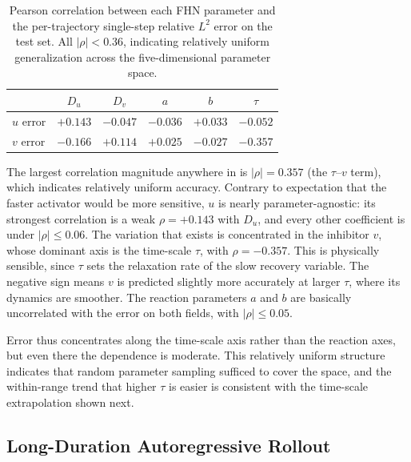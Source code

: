 \documentclass[runningheads]{llncs}
\begin{document}
\begin{table}[!ht]
\begin{center}
\begin{small}
\begin{sc}
\begin{tabular}{lccccc}
\toprule
 & $D_u$ & $D_v$ & $a$ & $b$ & $\tau$ \\
\midrule
$u$ error & $+0.143$ & $-0.047$ & $-0.036$ & $+0.033$ & $-0.052$ \\
$v$ error & $-0.166$ & $+0.114$ & $+0.025$ & $-0.027$ & $-0.357$ \\
\bottomrule
\end{tabular}
\end{sc}
\end{small}
\end{center}
\smallskip
\caption{Pearson correlation between each FHN parameter and the per-trajectory single-step relative $L^2$ error on the test set. All $|\rho| < 0.36$, indicating relatively uniform generalization across the five-dimensional parameter space.}
\label{tab:parameter_correlation}
\end{table}

The largest correlation magnitude anywhere in  is $|\rho| = 0.357$ (the $\tau$--$v$ term), which indicates relatively uniform accuracy. Contrary to expectation that the faster activator would be more sensitive, $u$ is nearly parameter-agnostic: its strongest correlation is a weak $\rho = +0.143$ with $D_u$, and every other coefficient is under $|\rho| \le 0.06$. The variation that exists is concentrated in the inhibitor $v$, whose dominant axis is the time-scale $\tau$, with $\rho = -0.357$. This is physically sensible, since $\tau$ sets the relaxation rate of the slow recovery variable. The negative sign means $v$ is predicted slightly more accurately at larger $\tau$, where its dynamics are smoother. The reaction parameters $a$ and $b$ are basically uncorrelated with the error on both fields, with $|\rho| \le 0.05$.

Error thus concentrates along the time-scale axis rather than the reaction axes, but even there the dependence is moderate. This relatively uniform structure indicates that random parameter sampling sufficed to cover the space, and the within-range trend that higher $\tau$ is easier is consistent with the time-scale extrapolation shown next.

\subsection{Long-Duration Autoregressive Rollout}
\label{sec:autoregressive_results}
\end{document}
